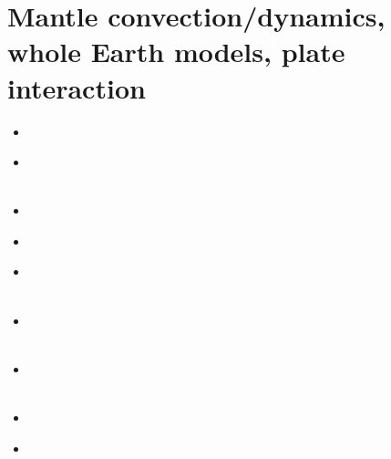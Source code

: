 \section{Mantle convection/dynamics, whole Earth models, plate interaction}

\begin{scriptsize}
\begin{itemize}
\item[\nineteensixtyseven] 
\textcite{tuox67} \\
\item[\nineteenseventyone] 
\textcite{totu71} \\
\textcite{buwh71} \\
\item[\nineteenseventytwo] 
\textcite{pelt72} \\
\item[\nineteenseventythree] 
\textcite{mcrw73} \\
\item[\nineteenseventyfour] 
\textcite{youn74} \\
\textcite{mcrw74} \\
\item[\nineteenseventyfive] 
\textcite{hemw75} \\
\textcite{buss75} \\
\item[\nineteenseventysix] 
\textcite{mcri76} \\
\textcite{sath76} \\
\item[\nineteenseventyseven] 
\textcite{yusc77} \\
\item[\nineteenseventyeight] 
\textcite{mahz78} \\ 
\textcite{hsui78} \\
\textcite{haoc78} \\
\textcite{pamc78} \\

\end{itemize}
\end{scriptsize}

